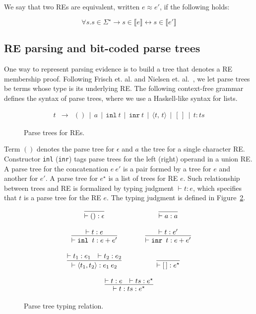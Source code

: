 \documentclass[review]{elsarticle}
\newcommand{\sembrackets}[1]{\ensuremath{\llbracket #1 \rrbracket}}
\theoremstyle{definition}
\begin{document}
We say that two REs are equivalent, written $e\approx e'$, if the following holds:

\[
\forall s. s\in \Sigma^\star \to s \in\sembrackets{e} \leftrightarrow s\in\sembrackets{e'} 
\]


\subsection{RE parsing and bit-coded parse trees}\label{subsection:bitcodedparsetrees}

One way to represent parsing evidence is to build a tree that denotes
a RE membership proof. Following Frisch et. al. and Nielsen et.
al.~\cite{Lasse2011,Frisch2004},
we let parse trees be terms whose type is its underlying RE. The following context-free 
grammar defines the syntax of parse trees, where we use a Haskell-like syntax for 
lists.

\begin{figure}[h]
   \[
      \begin{array}{lcl}
         t & \to & () \,\mid\, a \,\mid\, \texttt{inl}\:t  \,\mid\, \texttt{inr}\:t  \,\mid\, \langle t,\,t\rangle  \,\mid\, [\,]\,\mid\,t : ts
      \end{array}
   \]
   \caption{Parse trees for REs.}
   \label{figure:parsetreesyntax}
\end{figure}

Term $()$ denotes the parse tree for $\epsilon$ and $a$ the tree for a single character RE. 
Constructor \texttt{inl} (\texttt{inr}) tags parse trees for the left (right) operand in 
a union RE. A parse tree for the concatenation $e\:e'$ is a pair formed by a tree for $e$ and 
another for $e'$. A parse tree for $e^\star$ is a list of trees for RE $e$. Such relationship 
between trees and RE is formalized by typing judgment $\vdash t : e$, which specifies that 
$t$ is a parse tree for the RE $e$. The typing judgment is defined in Figure~\ref{figure:parsetreetyping}.


\begin{figure}[h]
   \[ 
       \begin{array}{ccc}
         \infer{\vdash () : \epsilon}{} & \hspace{.5cm} & \infer{\vdash a : a}{}\\
         \\
         \infer{\vdash \texttt{inl }t : e + e'}{\vdash t : e}  & & 
         \infer{\vdash \texttt{inr }t : e + e'}{\vdash t : e'} \\ 
         \\
         \infer{\vdash \langle t_1, t_2 \rangle : e_1\:e_2}
               {\vdash t_1 : e_1 & \vdash t_2 : e_2}   & & 
         \infer{\vdash [\,] : e^\star}{} \\ \\
         \multicolumn{3}{c}{
           \infer{\vdash t : ts : e ^\star}
                 {\vdash t : e & \vdash ts : e ^\star}
         }
       \end{array}
   \]
   \caption{Parse tree typing relation.}
   \label{figure:parsetreetyping}
\end{figure}
\end{document}
